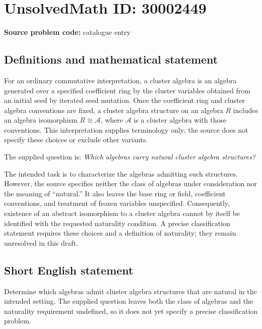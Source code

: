 \documentclass[11pt]{article}
\begin{document}
\section*{UnsolvedMath ID: 30002449}
\textbf{Source problem code:} catalogue entry
\subsection{Definitions and mathematical statement}
For an ordinary commutative interpretation, a cluster algebra is an algebra generated over a specified coefficient ring by the cluster variables obtained from an initial seed by iterated seed mutation. Once the coefficient ring and cluster algebra conventions are fixed, a cluster algebra structure on an algebra \(R\) includes an algebra isomorphism \(R\cong\mathcal{A}\), where \(\mathcal{A}\) is a cluster algebra with those conventions. This interpretation supplies terminology only; the source does not specify these choices or exclude other variants.

The supplied question is: \emph{Which algebras carry natural cluster algebra structures?}

The intended task is to characterize the algebras admitting such structures. However, the source specifies neither the class of algebras under consideration nor the meaning of ``natural.'' It also leaves the base ring or field, coefficient conventions, and treatment of frozen variables unspecified. Consequently, existence of an abstract isomorphism to a cluster algebra cannot by itself be identified with the requested naturality condition. A precise classification statement requires these choices and a definition of naturality; they remain unresolved in this draft.
\subsection{Short English statement}
Determine which algebras admit cluster algebra structures that are natural in the intended setting. The supplied question leaves both the class of algebras and the naturality requirement undefined, so it does not yet specify a precise classification problem.
\end{document}
